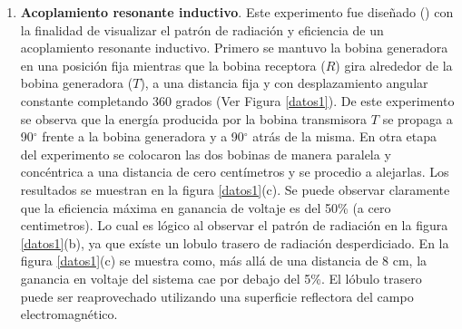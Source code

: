 \documentclass{intech}
\begin{document}
\begin{enumerate}
\item {\bf Acoplamiento resonante inductivo}. Este experimento fue dise\~nado (\cite{SOMI}) con la finalidad de visualizar el patr\'on de radiaci\'on y eficiencia
de un acoplamiento resonante inductivo. Primero se mantuvo la bobina generadora en una posici\'on fija mientras
que la bobina receptora ($R$) gira alrededor de la bobina generadora ($T$), a una distancia fija y con desplazamiento angular constante completando 360 grados (Ver Figura \ref{datos1}). De este experimento se observa que la energ{\'i}a producida por la bobina transmisora $T$ se propaga a 90$^\circ$ frente a la bobina generadora y a 90$^\circ$ atr\'as de la misma. En otra etapa del experimento se colocaron las dos bobinas de manera paralela y conc\'entrica a una distancia de cero cent{\'i}metros y se procedio a alejarlas. Los
resultados se muestran en la figura \ref{datos1}(c). Se puede observar claramente que la eficiencia m\'axima en ganancia de voltaje es del  50\% (a cero centimetros). Lo cual es l\'ogico
al observar el patr\'on de radiaci\'on  en la figura \ref{datos1}(b), ya que ex{\'i}ste un lobulo trasero de radiaci\'on desperdiciado. En la figura \ref{datos1}(c) se muestra como, m\'as all\'a de una distancia de 8 cm, la ganancia en voltaje del sistema cae por debajo del 5\%. El l\'obulo trasero puede ser reaprovechado utilizando una superficie reflectora del campo electromagn\'etico.
\begin{figure}[htbp]	%
\centering
{} %

\end{figure}
\end{enumerate}
\end{document}
